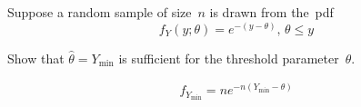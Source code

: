 \begin{problem}
   Suppose a random sample of size~$n$ is drawn from the~pdf
  \begin{equation*}
    f_{Y}(y;\theta) = e^{-(y-\theta)}\text{,  } \theta \leq y
  \end{equation*}
\end{problem}

\begin{subproblem}
  Show that ${\hat{\theta} = Y_{\min}}$ is sufficient for the threshold parameter~$\theta$.
\end{subproblem}
\begin{align}
  f_{Y_{\min}} = ne^{-n(Y_{\min} - \theta)} \\
\end{align}
